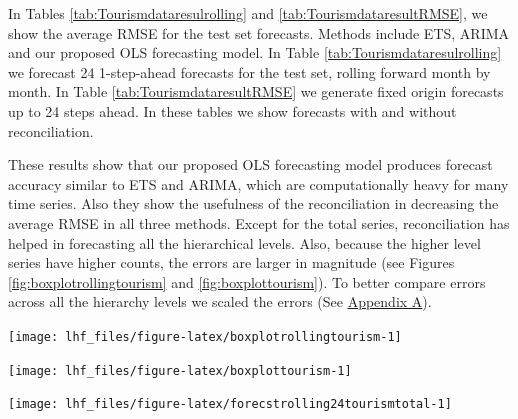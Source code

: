 \documentclass[11pt,a4paper,]{article}
\let\origfigure\figure
\let\endorigfigure\endfigure
\renewenvironment{figure}[1][2] {
    \expandafter\origfigure\expandafter[!htbp]
} {
    \endorigfigure
}
\begin{document}
In Tables \ref{tab:Tourismdataresulrolling} and
\ref{tab:TourismdataresultRMSE}, we show the average RMSE for the test
set forecasts. Methods include ETS, ARIMA and our proposed OLS
forecasting model. In Table \ref{tab:Tourismdataresulrolling} we
forecast 24 1-step-ahead forecasts for the test set, rolling forward
month by month. In Table \ref{tab:TourismdataresultRMSE} we generate
fixed origin forecasts up to 24 steps ahead. In these tables we show
forecasts with and without reconciliation.

These results show that our proposed OLS forecasting model produces
forecast accuracy similar to ETS and ARIMA, which are computationally
heavy for many time series. Also they show the usefulness of the
reconciliation in decreasing the average RMSE in all three methods.
Except for the total series, reconciliation has helped in forecasting
all the hierarchical levels. Also, because the higher level series have
higher counts, the errors are larger in magnitude (see Figures
\ref{fig:boxplotrollingtourism} and \ref{fig:boxplottourism}). To better
compare errors across all the hierarchy levels we scaled the errors (See
\protect\hyperlink{appendixA}{Appendix A}).

\begin{figure}

{\centering \texttt{[image: lhf\_files/figure-latex/boxplotrollingtourism-1]} 

}

\caption{Box plots of rolling origin forecast errors from reconciled and unreconciled ETS, ARIMA and OLS methods at each hierarchical level for tourism demand.}\label{fig:boxplotrollingtourism}
\end{figure}

\begin{figure}

{\centering \texttt{[image: lhf\_files/figure-latex/boxplottourism-1]} 

}

\caption{Box plots of fixed origin forecast errors for reconciled and unreconciled ETS, ARIMA and OLS methods at each hierarchical level for tourism demand.}\label{fig:boxplottourism}
\end{figure}

\begin{figure}

{\centering \texttt{[image: lhf\_files/figure-latex/forecstrolling24tourismtotal-1]} 

}

\caption{The actual test set for the 'Total series' compared to the forecasts from reconciled and unreconciled ETS, ARIMA and OLS methods for rolling and fixed origin tourism demand.}\label{fig:forecstrolling24tourismtotal}
\end{figure}
\end{document}
